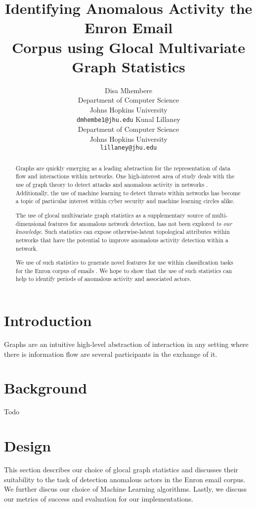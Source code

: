 \documentclass[11pt,letterpaper]{article}
\title{Identifying Anomalous Activity the Enron Email \\
				Corpus using Glocal Multivariate Graph Statistics}
\author{Disa Mhembere\\
  Department of Computer Science\\
  Johns Hopkins University\\
  {\tt dmhembe1@jhu.edu}
  \And
  Kunal Lillaney \\
  Department of Computer Science\\
  Johns Hopkins University\\
  {\tt lillaney@jhu.edu}}
\date{}
\begin{document}
\maketitle
\begin{abstract}
Graphs are quickly emerging as a leading abstraction for the representation of data
flow and interactions within networks. One high-interest area of study deals with 
the use of graph theory to detect attacks and anomalous activity in networks 
\cite{priebe2005scan,park2009anomaly,park2013anomaly}.
Additionally, the use of machine learning to detect threats within networks 
has become a topic of particular interest 
\cite{mahoney2003machine,shon2005machine,sommer2010outside,shon2007hybrid} within
cyber security and machine learning circles alike.

The use of glocal multivariate graph statistics \cite{mhembere2013computing} as 
a supplementary source of multi-dimensional features for anomalous network detection,
has not been explored \textit{to our knowledge}. Such statistics can expose 
otherwise-latent topological attributes within networks that have the potential 
to improve anomalous activity detection within a network. 

We use of such statistics to generate novel features for use within
classification tasks for the Enron corpus of emails \cite{enronrepo2009}.
We hope to show that the use of such statistics can help to identify periods of anomalous 
activity and associated actors.

\end{abstract}


\section{Introduction}
Graphs are an intuitive high-level abstraction of interaction in any setting where
there is information flow are several participants in the exchange of it.

\section{Background}
Todo

\section{Design}
This section describes our choice of glocal graph statistics and discusses their suitability
to the task of detection anomalous actors in the Enron email corpus.
We further discus our choice of Machine Learning algorithms. Lastly, we discuss our metrics
of success and evaluation for our implementations.
\end{document}
